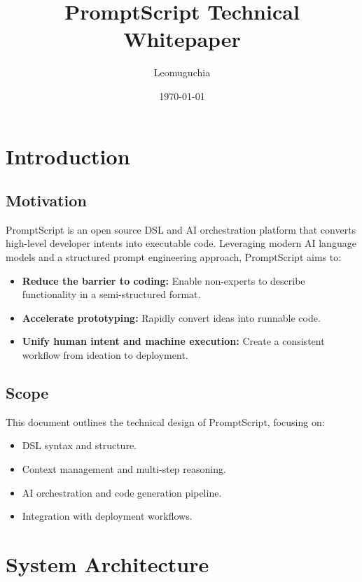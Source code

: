 \documentclass[11pt]{article}
\title{PromptScript Technical Whitepaper}
\author{Leomuguchia}
\date{\today}
\begin{document}
\maketitle
\tableofcontents
\newpage

\section{Introduction}

\subsection{Motivation}
PromptScript is an open source DSL and AI orchestration platform that converts high-level developer intents into executable code. Leveraging modern AI language models and a structured prompt engineering approach, PromptScript aims to:
\begin{itemize}[leftmargin=1.5em]
    \item \textbf{Reduce the barrier to coding:} Enable non-experts to describe functionality in a semi-structured format.
    \item \textbf{Accelerate prototyping:} Rapidly convert ideas into runnable code.
    \item \textbf{Unify human intent and machine execution:} Create a consistent workflow from ideation to deployment.
\end{itemize}

\subsection{Scope}
This document outlines the technical design of PromptScript, focusing on:
\begin{itemize}[leftmargin=1.5em]
    \item DSL syntax and structure.
    \item Context management and multi-step reasoning.
    \item AI orchestration and code generation pipeline.
    \item Integration with deployment workflows.
\end{itemize}

\section{System Architecture}
\end{document}

